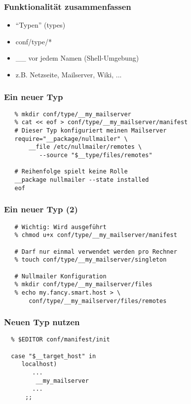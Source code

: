 \documentclass{beamer}
\begin{document}
\frame
{
  \frametitle{Funktionalität zusammenfassen}
  \begin{itemize}[<+->]
     \item "`Typen"' (types)
     \item conf/type/*
     \item \_\_ vor jedem Namen (Shell-Umgebung)
     \item z.B. Netzseite, Mailserver, Wiki, ...
  \end{itemize}
}

\begin{frame}[fragile]
   \frametitle{Ein neuer Typ}
   \begin{small}
   \begin{verbatim}
   % mkdir conf/type/__my_mailserver
   % cat << eof > conf/type/__my_mailserver/manifest
   # Dieser Typ konfiguriert meinen Mailserver
   require="__package/nullmailer" \
       __file /etc/nullmailer/remotes \
          --source "$__type/files/remotes"

   # Reihenfolge spielt keine Rolle
   __package nullmailer --state installed
   eof
   \end{verbatim}
   \end{small}
\end{frame}

\begin{frame}[fragile]
   \frametitle{Ein neuer Typ (2)}
   \begin{small}
   \begin{verbatim}
   # Wichtig: Wird ausgeführt
   % chmod u+x conf/type/__my_mailserver/manifest

   # Darf nur einmal verwendet werden pro Rechner
   % touch conf/type/__my_mailserver/singleton

   # Nullmailer Konfiguration
   % mkdir conf/type/__my_mailserver/files
   % echo my.fancy.smart.host > \
       conf/type/__my_mailserver/files/remotes
   \end{verbatim}
   \end{small}
\end{frame}

\begin{frame}[fragile]
  \frametitle{Neuen Typ nutzen}
  \begin{small}
  \begin{verbatim}
  % $EDITOR conf/manifest/init

  case "$__target_host" in
     localhost)
        ...
         __my_mailserver
        ...
      ;;
  \end{verbatim}
  \end{small}
\end{frame}
\end{document}
